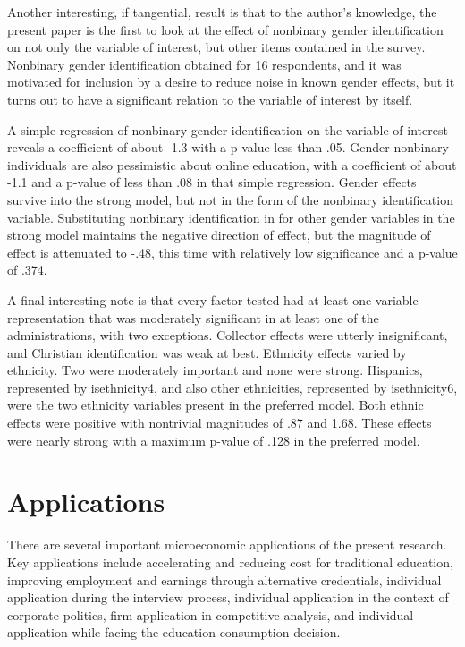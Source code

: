 \documentclass[AER]{/Users/zyl357/Documents/GitHub/research-dissertation-case-for-alt-ed/papers/alt-ed-survey/aea-latex-templates/AEA}
\begin{document}
Another interesting, if tangential, result is that to the author’s
knowledge, the present paper is the first to look at the effect of
nonbinary gender identification on not only the variable of interest, but
other items contained in the survey. Nonbinary gender identification
obtained for 16 respondents, and it was motivated for inclusion by a
desire to reduce noise in known gender effects, but it turns out to have a
significant relation to the variable of interest by itself.

A simple regression of nonbinary gender identification on the variable of
interest reveals a coefficient of about -1.3 with a p-value less than .05.
Gender nonbinary individuals are also pessimistic about online education,
with a coefficient of about -1.1 and a p-value of less than .08 in that
simple regression. Gender effects survive into the strong model, but not
in the form of the nonbinary identification variable. Substituting
nonbinary identification in for other gender variables in the strong model
maintains the negative direction of effect, but the magnitude of effect is
attenuated to -.48, this time with relatively low significance and a
p-value of .374.

A final interesting note is that every factor tested had at least one
variable representation that was moderately significant in at least one of
the administrations, with two exceptions. Collector effects were utterly
insignificant, and Christian identification was weak at best. Ethnicity
effects varied by ethnicity. Two were moderately important and none were
strong. Hispanics, represented by isethnicity4, and also other
ethnicities, represented by isethnicity6, were the two ethnicity variables
present in the preferred model. Both ethnic effects were positive with
nontrivial magnitudes of .87 and 1.68. These effects were nearly strong
with a maximum p-value of .128 in the preferred model.


\section{Applications}

There are several important microeconomic applications of the present
research. Key applications include accelerating and reducing cost for
traditional education, improving employment and earnings through
alternative credentials, individual application during the interview
process, individual application in the context of corporate politics, firm
application in competitive analysis, and individual application while
facing the education consumption decision.
\end{document}
